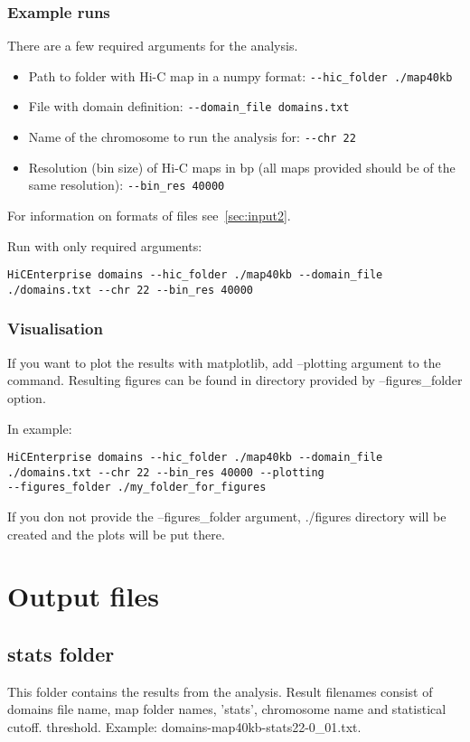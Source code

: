 \subsubsection{Example runs}
There are a few required arguments for the analysis.
\begin{itemize}
    \item Path to folder with Hi-C map in a numpy format: \lstinline{--hic_folder ./map40kb}
    \item File with domain definition: \lstinline{--domain_file domains.txt}
    \item Name of the chromosome to run the analysis for: \lstinline{--chr 22}
    \item Resolution (bin size) of Hi-C maps in bp (all maps provided should be of the same resolution): \lstinline{--bin_res 40000}
\end{itemize}

For information on formats of files see~\ref{sec:input2}.

Run with only required arguments:

\begin{lstlisting}
HiCEnterprise domains --hic_folder ./map40kb --domain_file
./domains.txt --chr 22 --bin_res 40000
\end{lstlisting}


\subsubsection{Visualisation} %

If you want to plot the results with matplotlib, add --plotting argument to the command. Resulting figures can be found in directory
provided by --figures\_folder option.

In example:
\begin{lstlisting}
HiCEnterprise domains --hic_folder ./map40kb --domain_file
./domains.txt --chr 22 --bin_res 40000 --plotting
--figures_folder ./my_folder_for_figures
\end{lstlisting}


If you don not provide the --figures\_folder argument, ./figures directory will be created and the plots will be put
there.

\section{Output files}

\subsection{stats folder}
This folder contains the results from the analysis. Result filenames consist of domains file name, map folder names,
'stats', chromosome name and statistical cutoff. %
threshold. Example: domains-map40kb-stats22-0\_01.txt.

